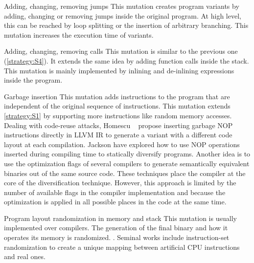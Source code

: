 \begin{strategy}{Adding, changing, removing jumps}
    \label{strategy:S4}
    \normalfont
    This mutation creates program variants by adding, changing or removing jumps inside the original program. At high level, this can be reached by loop splitting or the insertion of arbitrary branching. This mutation increases the execution time of variants.
\end{strategy}


\begin{strategy}{Adding, changing, removing calls}
    \label{strategy:S5}
    \normalfont
    This mutation is similar to the previous one (\autoref{strategy:S4}). It extends the same idea by adding function calls inside the stack. This mutation is mainly implemented by inlining and de-inlining expressions inside the program.
\end{strategy}


\begin{strategy}{Garbage insertion}
    \label{strategy:S6}
    \normalfont
    This mutation adds instructions to the program that are independent of the original sequence of instructions. This mutation extends \autoref{strategy:S1} by supporting more instructions like random memory accesses.
    Dealing with code-reuse attacks, Homescu \etal~\cite{homescu2013profile} propose inserting garbage NOP instructions directly in LLVM IR to generate a variant with a different code layout at each compilation. 
    Jackson \etal \cite{jackson} have explored how to use NOP operations inserted during compiling time to statically diversify programs. Another idea  is to use the optimization flags of several compilers to generate semantically equivalent binaries out of the same source code. These techniques place the compiler at the core of the diversification technique. However, this approach is limited by the number of available flags in the compiler implementation and because the optimization is applied in all possible places in the code at the same time.
\end{strategy}

\begin{strategy}{Program layout randomization in memory and stack}
    \label{strategy:S7}
    \normalfont
    This mutation is usually implemented over compilers. The generation of the final binary and how it operates its memory is randomized. .
    Seminal works include instruction-set randomization \cite{Kc03,barrantes2003randomized}
    to create a unique mapping between artificial CPU instructions and real ones.  %
\end{strategy}


